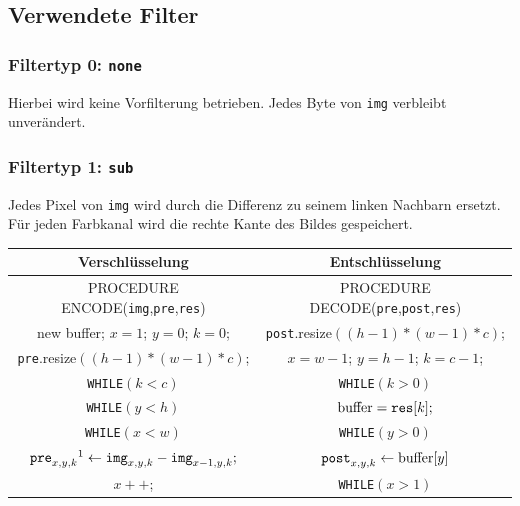 \documentclass[a4paper,12pt]{article}
\begin{document}
\subsection{Verwendete Filter}
\subsubsection{Filtertyp 0: {\tt{none}} }
Hierbei wird keine Vorfilterung betrieben. Jedes Byte von {\tt{img}} verbleibt unverändert.

\subsubsection{Filtertyp 1: {\tt{sub}}}
\begin{minipage}[h]{.6\textwidth}
Jedes Pixel von {\tt{img}} wird durch die Differenz zu seinem linken Nachbarn ersetzt. Für jeden Farbkanal wird die rechte Kante des Bildes gespeichert.
\vspace{1.5cm}
\end{minipage}
\hfill
\begin{minipage}[h]{.4\textwidth}
\begin{flushright}
\end{flushright}
\end{minipage}
\par
\vspace{1cm}
\begin{tabular}{c|c}
Verschlüsselung & Entschlüsselung
\\
\hline
PROCEDURE ENCODE({\tt{img}},{\tt{pre}},{\tt{res}}) & PROCEDURE DECODE({\tt{pre}},{\tt{post}},{\tt{res}})
\\
new buffer; $x=1$; $y=0$; $k=0$; & {\tt{post}}.resize$((h-1)*(w-1)*c)$;
\\
{\tt{pre}}.resize$((h-1)*(w-1)*c)$; & $x=w-1$; $y=h-1$; $k=c-1$;
\\
{\tt{WHILE}}$(k < c)$ &                  {\tt{WHILE}}$(k > 0)$
\\
{\tt{WHILE}}$(y < h)$ &               $\text{buffer} = \text{{\tt{res}}}[k];$
\\
{\tt{WHILE}}$(x < w)$ &              {\tt{WHILE}}$(y>0)$
\\
$\text{{\tt{pre}}}_{x,y,k}\footnotemark\leftarrow \text{{\tt{img}}}_{x,y,k} - \text{{\tt{img}}}_{x-1,y,k};$ &  $\text{{\tt{post}}}_{x,y,k}\leftarrow \text{buffer}[y]$
\\
$x++$; & {\tt{WHILE}}$(x>1)$
\end{tabular}
\end{document}
